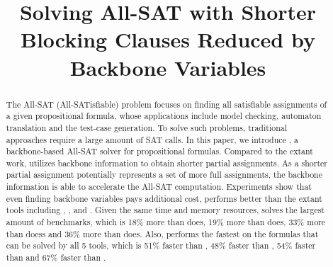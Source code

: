 \documentclass{article}
\begin{document}
\title{Solving All-SAT with Shorter Blocking Clauses Reduced by Backbone Variables}
\maketitle
\begin{abstract}
The All-SAT (All-SATisfiable) problem focuses on finding all satisfiable assignments of a given propositional formula, whose applications include model checking, automaton translation and the test-case generation. To solve such problems, traditional approaches require a large amount of SAT calls.
In this paper, we introduce \tool, a backbone-based All-SAT solver for propositional formulas. Compared to the extant work, \tool utilizes backbone information to obtain shorter partial assignments. As a shorter partial assignment potentially represents a set of more full assignments, the backbone information is able to accelerate the All-SAT computation. 
Experiments show that even finding backbone variables pays additional cost, \tool performs better than the extant tools including \ctool, \bc, \nbc and \bdd.
Given the same time and memory resources, \tool solves the largest amount of benchmarks, which is 18\% more than \ctool does, 19\% more than \bc does, 33\% more than \nbc doess and 36\% more than \bdd does.
Also, \tool performs the fastest on the formulas that can be solved by all 5 tools, which is 51\% faster than \ctool, 48\% faster than \bc, 54\% faster than \nbc and 67\% faster than \bdd.
\end{abstract}








\end{document}
